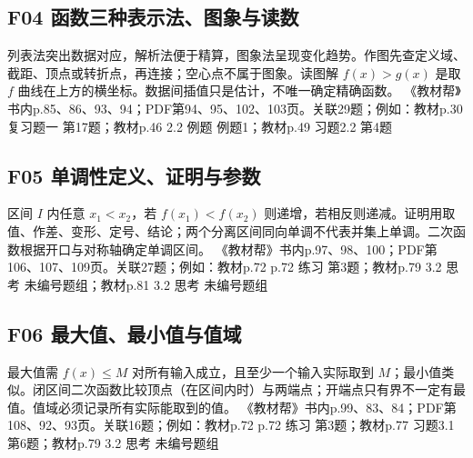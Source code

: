 \par\medskip\noindent\begin{minipage}{\linewidth}\subsection{F04 函数三种表示法、图象与读数}
列表法突出数据对应，解析法便于精算，图象法呈现变化趋势。作图先查定义域、截距、顶点或转折点，再连接；空心点不属于图象。读图解 $f(x)>g(x)$ 是取 $f$ 曲线在上方的横坐标。数据间插值只是估计，不唯一确定精确函数。
{\small 《教材帮》书内p.85、86、93、94；PDF第94、95、102、103页。关联29题；例如：教材p.30 复习题一 第17题；教材p.46 2.2 例题 例题1；教材p.49 习题2.2 第4题}\par\end{minipage}\par
\par\medskip\noindent\begin{minipage}{\linewidth}\subsection{F05 单调性定义、证明与参数}
区间 $I$ 内任意 $x_1<x_2$，若 $f(x_1)<f(x_2)$ 则递增，若相反则递减。证明用取值、作差、变形、定号、结论；两个分离区间同向单调不代表并集上单调。二次函数根据开口与对称轴确定单调区间。
{\small 《教材帮》书内p.97、98、100；PDF第106、107、109页。关联27题；例如：教材p.72 p.72 练习 第3题；教材p.79 3.2 思考 未编号题组；教材p.81 3.2 思考 未编号题组}\par\end{minipage}\par
\par\medskip\noindent\begin{minipage}{\linewidth}\subsection{F06 最大值、最小值与值域}
最大值需 $f(x)\le M$ 对所有输入成立，且至少一个输入实际取到 $M$；最小值类似。闭区间二次函数比较顶点（在区间内时）与两端点；开端点只有界不一定有最值。值域必须记录所有实际能取到的值。
{\small 《教材帮》书内p.99、83、84；PDF第108、92、93页。关联16题；例如：教材p.72 p.72 练习 第3题；教材p.77 习题3.1 第6题；教材p.79 3.2 思考 未编号题组}\par\end{minipage}\par

